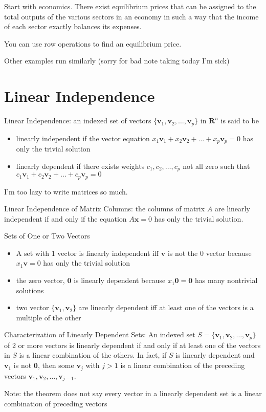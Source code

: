 \documentclass[../linalg.tex]{subfiles}
\begin{document}
Start with economics. There exist equilibrium prices that can be assigned to the total outputs of the various sectors in an economy in such a way that the income of each sector exactly balances its expenses.

You can use row operations to find an equilibrium price.

Other examples run similarly (sorry for bad note taking today I'm sick)

\section{Linear Independence}
Linear Independence: an indexed set of vectors $\{\textbf{v}_1,\textbf{v}_2,\dots,\textbf{v}_p\}$ in $\textbf{R}^n$ is said to be 
\begin{itemize}
    \item linearly independent if the vector equation $x_1\textbf{v}_1+x_2\textbf{v}_2+\dots+x_p\textbf{v}_p=0$ has only the trivial solution 
    \item linearly dependent if there exists weights $c_1,c_2,\dots,c_p$ not all zero such that $c_1\textbf{v}_1+c_2\textbf{v}_2+\dots+c_p\textbf{v}_p=0$
\end{itemize}

I'm too lazy to write matrices so much.

Linear Independence of Matrix Columns: the columns of matrix $A$ are linearly independent if and only if the equation $A\textbf{x}=0$ has only the trivial solution.

Sets of One or Two Vectors 
\begin{itemize}
    \item A set with 1 vector is linearly independent iff $\textbf{v}$ is not the 0 vector because $x_1\textbf{v}=0$ has only the trivial solution 
    \item the zero vector, $\textbf{0}$ is linearly dependent because $x_1\textbf{0}=\textbf{0}$ has many nontrivial solutions 
    \item two vector $\{\textbf{v}_1,\textbf{v}_2\}$ are linearly dependent iff at least one of the vectors is a multiple of the other 
\end{itemize}

\begin{theorem}
    Characterization of Linearly Dependent Sets: An indexed set $S=\{\textbf{v}_1,\textbf{v}_2,\dots,\textbf{v}_p\}$ of 2 or more vectors is linearly dependent if and only if at least 
    one of the vectors in $S$ is a linear combination of the others. In fact, if $S$ is linearly dependent and $\textbf{v}_1$ is not $\textbf{0}$, then some $\textbf{v}_j$ with $j>1$ is a linear combination 
    of the preceding vectors $\textbf{v}_1,\textbf{v}_2,\dots,\textbf{v}_{j-1}$.

    Note: the theorem does not say every vector in a linearly dependent set is a linear combination of preceding vectors 
\end{theorem}
\end{document}
